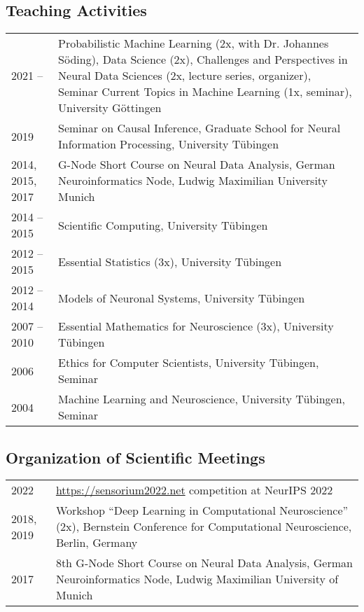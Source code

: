 \documentclass[COG,11pt]{ercgrant}
\begin{document}
\subsection{Teaching Activities}
\begin{tabular}{p{3.5cm}p{11.5cm}}
2021 --  & Probabilistic Machine Learning (2x, with Dr. Johannes Söding), Data Science (2x), Challenges and Perspectives in Neural Data Sciences (2x, lecture series, organizer), Seminar Current Topics in Machine Learning (1x, seminar), University Göttingen\\
2019 & Seminar on Causal Inference, Graduate School for Neural Information Processing, University Tübingen \\
2014, 2015, 2017  & G-Node Short Course on Neural Data Analysis, German Neuroinformatics Node, Ludwig Maximilian University Munich\\
2014 -- 2015 &  Scientific Computing, University T\"ubingen\\
2012 -- 2015 & Essential Statistics (3x), University T\"ubingen \\
2012 -- 2014 & Models of Neuronal Systems, University T\"ubingen\\
2007 -- 2010 & Essential Mathematics for Neuroscience (3x), University T\"ubingen\\
2006 & Ethics for Computer Scientists, University T\"ubingen, Seminar\\
2004 & Machine Learning and Neuroscience, University T\"ubingen, Seminar\\ 
\end{tabular}

\subsection{Organization of Scientific Meetings}
\begin{tabular}{p{3cm}p{12cm}}
2022 & \url{https://sensorium2022.net} competition at NeurIPS 2022\\
2018, 2019  & Workshop ``Deep Learning in Computational Neuroscience'' (2x), Bernstein Conference for Computational Neuroscience, Berlin, Germany\\
2017 & 8th G-Node Short Course on Neural Data Analysis, German Neuroinformatics Node, Ludwig Maximilian University of Munich\\
\end{tabular}
\end{document}
